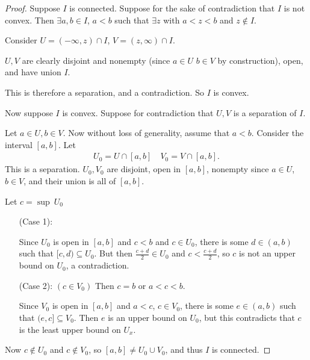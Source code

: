 \documentclass[12pt, twosided]{article}
\begin{document}
\begin{proof}
  Suppose \(I\) is connected. Suppose for the sake of contradiction that \(I\) is not convex. Then \(\exists a,b \in I\), \(a < b\) such that \(\exists z\) with \(a < z < b\) and \(z \not\in I\).

  Consider \(U = (-\infty, z) \cap I\), \(V= (z, \infty) \cap I\).

  \(U, V\) are clearly disjoint and nonempty (since \(a \in U\) \(b \in V\) by construction), open, and have union \(I\).

  This is therefore a separation, and a contradiction. So \(I\) is convex.

  Now suppose \(I\) is convex. Suppose for contradiction that \(U, V\) is a separation of \(I\).

  Let \(a \in U, b\in V\). Now without loss of generality, assume that \(a < b\). Consider the interval \([a,b]\). Let
  \begin{align*}
    U_0 = U \cap [a,b] \quad V_0 = V \cap [a, b].
  \end{align*}
  This is a separation. \(U_0, V_0\) are disjoint, open in \([a,b]\), nonempty since \(a \in U\), \(b \in V\), and their union is all of \([a,b]\).

  Let \(c = \sup\ U_0\)

  \begin{enumerate}
  \item [(Case 1):]\hspace{1em}

    \begin{center}
    \end{center}
    Since \(U_0\) is open in \([a,b]\) and \(c < b\) and \(c \in U_0\), there is some \(d \in (a,b)\) such that \([c, d) \subseteq U_0\). But then \(\frac{c + d}{2} \in U_0\) and \(c < \frac{c + d}{2}\), so \(c\) is not an upper bound on \(U_0\), a contradiction.

    
  \item [(Case 2):] \((c \in V_0)\) Then \(c = b\) or \(a < c < b\).

    Since \(V_0\) is open in \([a,b]\) and \(a < c\), \(c \in V_0\), there is some \(e \in (a, b)\) such that \((e,c] \subseteq V_0\). Then \(e\) is an upper bound on \(U_0\), but this contradicts that \(c\) is the least upper bound on \(U_x\).
    
  \end{enumerate}

  Now \(c \not\in U_0\) and \(c \not\in V_0\), so \([a,b] \neq U_0 \cup V_0\), and thus \(I\) is connected.
\end{proof}
\end{document}
